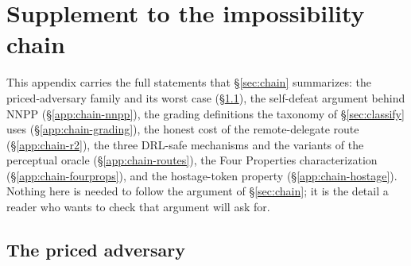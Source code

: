 \section{Supplement to the impossibility chain}
\label{app:chain}

\noindent This appendix carries the full statements that \S\ref{sec:chain}
summarizes: the priced-adversary family and its worst case
(\S\ref{app:chain-priced}), the self-defeat argument behind NNPP
(\S\ref{app:chain-nnpp}), the grading definitions the taxonomy of
\S\ref{sec:classify} uses (\S\ref{app:chain-grading}), the honest cost of the
remote-delegate route (\S\ref{app:chain-r2}), the three DRL-safe mechanisms and
the variants of the perceptual oracle (\S\ref{app:chain-routes}), the Four
Properties characterization (\S\ref{app:chain-fourprops}), and the
hostage-token property (\S\ref{app:chain-hostage}). Nothing here is needed to
follow the argument of \S\ref{sec:chain}; it is the detail a reader who wants to
check that argument will ask for.

\subsection{The priced adversary}
\label{app:chain-priced}

